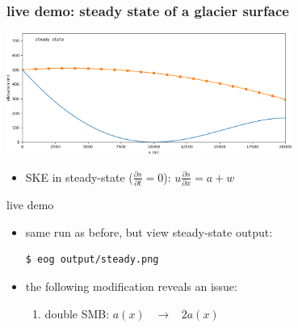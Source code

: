 \documentclass[10pt,dvipsnames]{beamer}
\begin{document}
\begin{frame}[fragile]
\frametitle{live demo: steady state of a glacier surface}
\begin{center}
\includegraphics[width=0.7\textwidth]{steady}
\end{center}

\bigskip
\begin{itemize}
\item SKE in steady-state ($\frac{\partial s}{\partial t}=0$): \quad $\displaystyle u \frac{\partial s}{\partial x} = a + w$
\end{itemize}

\begin{block}{live demo}
\begin{itemize}
\item same run as before, but view steady-state output:
\begin{verbatim}
$ eog output/steady.png
\end{verbatim}
\item the following modification reveals an issue:
    \begin{enumerate}
    \item double SMB: \quad $a(x)$ \, $\to$ \, $2 a(x)$
    \end{enumerate}
\end{itemize}
\end{block}
\end{frame}
\end{document}
